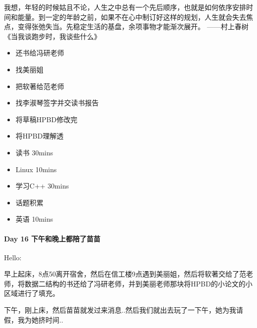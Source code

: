 \documentclass[UTF8,a4paper,8pt]{ctexbook}
\begin{document}
			 	 我想，年轻的时候姑且不论，人生之中总有一个先后顺序，也就是如何依序安排时间和能量。到一定的年龄之前，如果不在心中制订好这样的规划，人生就会失去焦点，变得张弛失当。先稳定生活的基盘，余项事物才能渐次展开。
			 	 ——村上春树《当我谈跑步时，我谈些什么》
			 	 \begin{itemize}
			 	 	\item  \makebox[0pt][l]{$\square$}\raisebox{.15ex}{\hspace{0.1em}$\checkmark$}还书给冯研老师
			 	 	\item  \makebox[0pt][l]{$\square$}\raisebox{.15ex}{\hspace{0.1em}$\checkmark$}找美丽姐
			 	 	\item  \makebox[0pt][l]{$\square$}\raisebox{.15ex}{\hspace{0.1em}$\checkmark$}把软著给范老师
			 	 	\item  \makebox[0pt][l]{$\square$}\raisebox{.15ex}{\hspace{0.1em}$\checkmark$}找李淑琴签字并交读书报告
			 	 	\item  \makebox[0pt][l]{$\square$}\raisebox{.15ex}{\hspace{0.1em}$\checkmark$}将草稿HPBD修改完
			 	 	\item  将HPBD理解透
			 	 	
			 	 	\item  读书 30mins	
			 	 	\item  Linux 10mins	  
			 	 	\item  学习C++ 30mins 
			 	 	
			 	 	\item  \makebox[0pt][l]{$\square$}\raisebox{.15ex}{\hspace{0.1em}$\checkmark$}话题积累 	
			 	 	\item  英语 10mins 	 
			 	 \end{itemize}
			 	 		 	 
 	 \paragraph{Day 16  下午和晚上都陪了苗苗    \quad     }
		 	 Hello:
		 	 
		 	 早上起床，8点50离开宿舍，然后在信工楼9点遇到美丽姐，然后将软著交给了范老师，将数据二结构的书还给了冯研老师，并到美丽老师那块将HPBD的小论文的小区域进行了填充。
		 	 
		 	 下午，刚上床，然后苗苗就发过来消息..然后我们就出去玩了一下午，她为我请假，我为她挤时间..
		 	 
\end{document}
